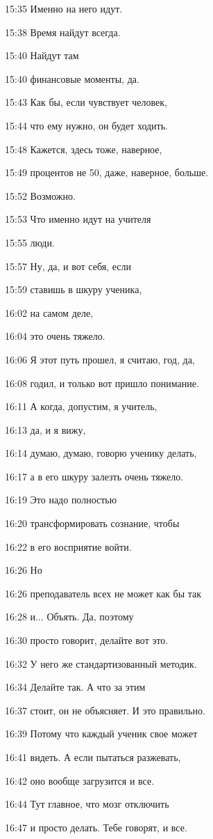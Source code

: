 15:35
Именно на него идут.

15:38
Время найдут всегда.

15:40
Найдут там

15:40
финансовые моменты, да.

15:43
Как бы, если чувствует человек,

15:44
что ему нужно, он будет ходить.

15:48
Кажется, здесь тоже, наверное,

15:49
процентов не 50, даже, наверное, больше.

15:52
Возможно.

15:53
Что именно идут на учителя

15:55
люди.

15:57
Ну, да, и вот себя, если

15:59
ставишь в шкуру ученика,

16:02
на самом деле,

16:04
это очень тяжело.

16:06
Я этот путь прошел, я считаю, год, да,

16:08
годил, и только вот пришло понимание.

16:11
А когда, допустим, я учитель,

16:13
да, и я вижу,

16:14
думаю, думаю, говорю ученику делать,

16:17
а в его шкуру залезть очень тяжело.

16:19
Это надо полностью

16:20
трансформировать сознание, чтобы

16:22
в его восприятие войти.

16:26
Но

16:26
преподаватель всех не может как бы так

16:28
и... Объять. Да, поэтому

16:30
просто говорит, делайте вот это.

16:32
У него же стандартизованный методик.

16:34
Делайте так. А что за этим

16:37
стоит, он не объясняет. И это правильно.

16:39
Потому что каждый ученик свое может

16:41
видеть. А если пытаться разжевать,

16:42
оно вообще загрузится и все.

16:44
Тут главное, что мозг отключить

16:47
и просто делать. Тебе говорят, и все.

